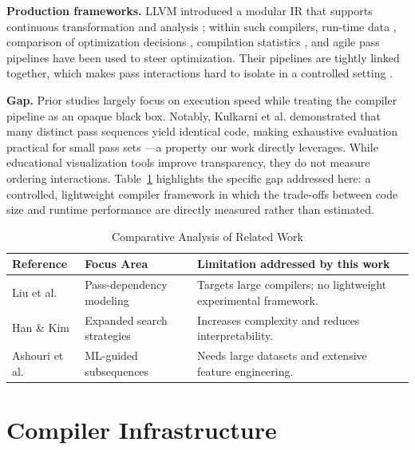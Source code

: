 \documentclass[conference,a4paper]{IEEEtran}
\begin{document}
\textbf{Production frameworks.} LLVM introduced a modular IR that supports continuous transformation and analysis \cite{ref16}; within such compilers, run-time data \cite{ref23}, comparison of optimization decisions \cite{ref24}, compilation statistics \cite{ref7}, and agile pass pipelines \cite{ref27} have been used to steer optimization. Their pipelines are tightly linked together, which makes pass interactions hard to isolate in a controlled setting \cite{ref16}.

\textbf{Gap.} Prior studies largely focus on execution speed while treating the compiler pipeline as an opaque black box. Notably, Kulkarni et al. demonstrated that many distinct pass sequences yield identical code, making exhaustive evaluation practical for small pass sets \cite{ref19}---a property our work directly leverages. While educational visualization tools \cite{ref30} improve transparency, they do not measure ordering interactions. Table~\ref{tab:lit_review} highlights the specific gap addressed here: a controlled, lightweight compiler framework in which the trade-offs between code size and runtime performance are directly measured rather than estimated.

\begin{table}[htbp]
\caption{Comparative Analysis of Related Work}
\label{tab:lit_review}
\centering
\renewcommand{\arraystretch}{1.1}
{\small
\begin{tabularx}{\columnwidth}{@{}p{} p{} X@{}}
\toprule
\textbf{Reference} & \textbf{Focus Area} & \textbf{Limitation addressed by this work} \\
\midrule
Liu et al. \cite{ref1} & Pass-dependency modeling & Targets large compilers; no lightweight experimental framework. \\
Han \& Kim \cite{ref2} & Expanded search strategies & Increases complexity and reduces interpretability. \\
Ashouri et al. \cite{ref15} & ML-guided subsequences & Needs large datasets and extensive feature engineering. \\
\bottomrule
\end{tabularx}
}
\end{table}

\section{Compiler Infrastructure}
\end{document}
